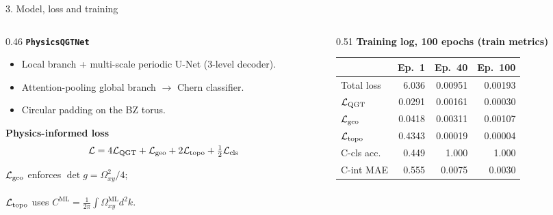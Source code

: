 \documentclass[aspectratio=169,11pt]{beamer}
\newcommand{\ML}{\mathrm{ML}}
\begin{document}
\begin{frame}{3. Model, loss and training}
\footnotesize

\begin{columns}[T]
\begin{column}{0.46\textwidth}
\textbf{\texttt{PhysicsQGTNet}}
\begin{itemize}
    \item Local branch + multi-scale periodic U-Net (3-level decoder).
    \item Attention-pooling global branch $\rightarrow$ Chern classifier.
    \item Circular padding on the BZ torus.
\end{itemize}

\textbf{Physics-informed loss}
{\scriptsize
\[
\mathcal L=4\mathcal L_{\rm QGT}+\mathcal L_{\rm geo}+2\mathcal L_{\rm topo}+\tfrac12\mathcal L_{\rm cls}
\]}
\vspace{-3mm}

{\scriptsize $\mathcal L_{\rm geo}$ enforces $\det g=\Omega_{xy}^2/4$;\\\\
$\mathcal L_{\rm topo}$ uses $C^{\ML}=\frac1{2\pi}\!\int\!\Omega^{\ML}_{xy}d^2k$.}
\end{column}

\begin{column}{0.51\textwidth}
\centering
\textbf{Training log, 100 epochs (train metrics)}

\vspace{0.05cm}
\scriptsize
\renewcommand{\arraystretch}{1.08}
\begin{tabular}{@{}lrrr@{}}
\toprule
 & Ep.\ 1 & Ep.\ 40 & Ep.\ 100\\
\midrule
Total loss & 6.036 & 0.00951 & 0.00193\\
$\mathcal L_{\rm QGT}$ & 0.0291 & 0.00161 & 0.00030\\
$\mathcal L_{\rm geo}$ & 0.0418 & 0.00311 & 0.00107\\
$\mathcal L_{\rm topo}$ & 0.4343 & 0.00019 & 0.00004\\
C-cls acc. & 0.449 & 1.000 & 1.000\\
C-int MAE & 0.555 & 0.0075 & 0.0030\\
\bottomrule
\end{tabular}
\end{column}
\end{columns}

\vspace{0.10cm}
\end{frame}
\end{document}
